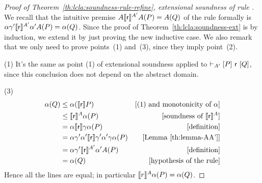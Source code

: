 \begin{proof}[Proof of Theorem~\ref{th:lcla:soundness-rule-refine}, extensional soundness of rule ]
	We recall that the intuitive premise $A \llbracket\mathsf{r}\rrbracket^{A'} A(P) = A(Q)$ of the rule formally is $\alpha \gamma' \llbracket\mathsf{r}\rrbracket^{A'} \alpha' A(P) = \alpha(Q)$.
	Since the proof of Theorem~\ref{th:lcla:soundness-ext} is by induction, we extend it by just proving the new inductive case. We also remark that we only need to prove points~(1) and~(3), since they imply point~(2).

	\noindent (1) It's the same as point (1) of extensional soundness applied to $\vdash_{A'}\nobreak[P]~\mathsf{r}~[Q]$, since this conclusion does not depend on the abstract domain.

	\noindent (3)
	\begin{align*}
		\alpha(Q) & \le \alpha(\llbracket\mathsf{r}\rrbracket P)                                             & [\text{(1) and monotonicity of }\alpha]  \\
		          & \le \llbracket\mathsf{r}\rrbracket^{A} \alpha(P)                                         & [\text{soundness of } \llbracket\mathsf{r}\rrbracket^{A}] \\
		          & = \alpha \llbracket\mathsf{r}\rrbracket \gamma \alpha(P)                                 & [\text{definition}]                      \\
		          & = \alpha \gamma' \alpha' \llbracket\mathsf{r}\rrbracket \gamma' \alpha' \gamma \alpha(P) & [\text{Lemma~\ref{th:lemma-AA'}}]        \\
		          & = \alpha \gamma' \llbracket\mathsf{r}\rrbracket^{A'} \alpha' A(P)                        & [\text{definition}]                      \\
		          & = \alpha(Q)                                                             & [\text{hypothesis of the rule}]
	\end{align*}
	Hence all the lines are equal; in particular $\llbracket r\rrbracket^{A} \alpha(P) = \alpha(Q)$.
\end{proof}

